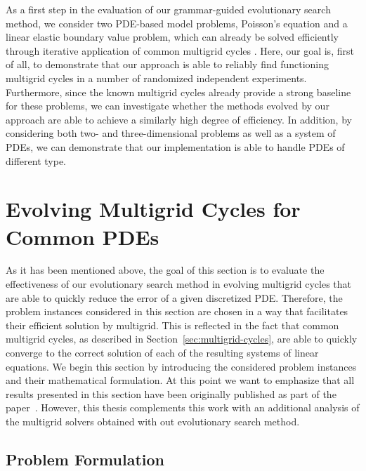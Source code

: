 As a first step in the evaluation of our grammar-guided evolutionary search method, we consider two PDE-based model problems, Poisson's equation and a linear elastic boundary value problem, which can already be solved efficiently through iterative application of common multigrid cycles .
Here, our goal is, first of all, to demonstrate that our approach is able to reliably find functioning multigrid cycles in a number of randomized independent experiments.
Furthermore, since the known multigrid cycles already provide a strong baseline for these problems, we can investigate whether the methods evolved by our approach are able to achieve a similarly high degree of efficiency.
In addition, by considering both two- and three-dimensional problems as well as a system of PDEs, we can demonstrate that our implementation is able to handle PDEs of different type.
\section{Evolving Multigrid Cycles for Common PDEs}
As it has been mentioned above, the goal of this section is to evaluate the effectiveness of our evolutionary search method in evolving multigrid cycles that are able to quickly reduce the error of a given discretized PDE.
Therefore, the problem instances considered in this section are chosen in a way that facilitates their efficient solution by multigrid.
This is reflected in the fact that common multigrid cycles, as described in Section~\ref{sec:multigrid-cycles}, are able to quickly converge to the correct solution of each of the resulting systems of linear equations.
We begin this section by introducing the considered problem instances and their mathematical formulation.
At this point we want to emphasize that all results presented in this section have been originally published as part of the paper~\cite{schmitt2021evostencils}.
However, this thesis complements this work with an additional analysis of the multigrid solvers obtained with out evolutionary search method.
\subsection{Problem Formulation}

